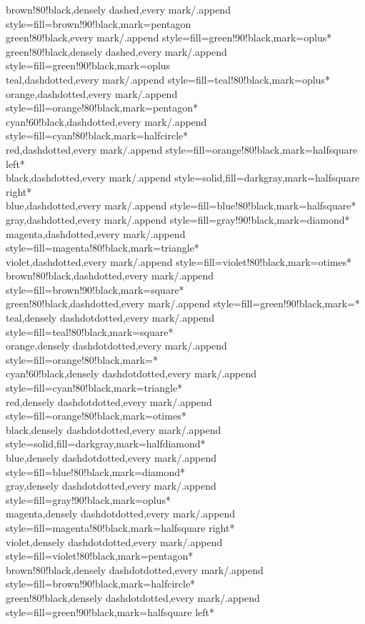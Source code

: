 \documentclass[a4paper]{article}
\begin{document}
{	brown!80!black,densely dashed,every mark/.append style={fill=brown!90!black},mark=pentagon\\
	green!80!black,every mark/.append style={fill=green!90!black},mark=oplus*\\
	green!80!black,densely dashed,every mark/.append style={fill=green!90!black},mark=oplus\\
	teal,dashdotted,every mark/.append style={fill=teal!80!black},mark=oplus*\\
	orange,dashdotted,every mark/.append style={fill=orange!80!black},mark=pentagon*\\
	cyan!60!black,dashdotted,every mark/.append style={fill=cyan!80!black},mark=halfcircle*\\
	red,dashdotted,every mark/.append style={fill=orange!80!black},mark=halfsquare left*\\
	black,dashdotted,every mark/.append style={solid,fill=darkgray},mark=halfsquare right*\\
	blue,dashdotted,every mark/.append style={fill=blue!80!black},mark=halfsquare*\\
	gray,dashdotted,every mark/.append style={fill=gray!90!black},mark=diamond*\\
	magenta,dashdotted,every mark/.append style={fill=magenta!80!black},mark=triangle*\\
	violet,dashdotted,every mark/.append style={fill=violet!80!black},mark=otimes*\\
	brown!80!black,dashdotted,every mark/.append style={fill=brown!90!black},mark=square*\\
	green!80!black,dashdotted,every mark/.append style={fill=green!90!black},mark=*\\
	teal,densely dashdotdotted,every mark/.append style={fill=teal!80!black},mark=square*\\
	orange,densely dashdotdotted,every mark/.append style={fill=orange!80!black},mark=*\\
	cyan!60!black,densely dashdotdotted,every mark/.append style={fill=cyan!80!black},mark=triangle*\\
	red,densely dashdotdotted,every mark/.append style={fill=orange!80!black},mark=otimes*\\
	black,densely dashdotdotted,every mark/.append style={solid,fill=darkgray},mark=halfdiamond*\\
	blue,densely dashdotdotted,every mark/.append style={fill=blue!80!black},mark=diamond*\\
	gray,densely dashdotdotted,every mark/.append style={fill=gray!90!black},mark=oplus*\\
	magenta,densely dashdotdotted,every mark/.append style={fill=magenta!80!black},mark=halfsquare right*\\
	violet,densely dashdotdotted,every mark/.append style={fill=violet!80!black},mark=pentagon*\\
	brown!80!black,densely dashdotdotted,every mark/.append style={fill=brown!90!black},mark=halfcircle*\\
	green!80!black,densely dashdotdotted,every mark/.append style={fill=green!90!black},mark=halfsquare left*\\
}
\end{document}
